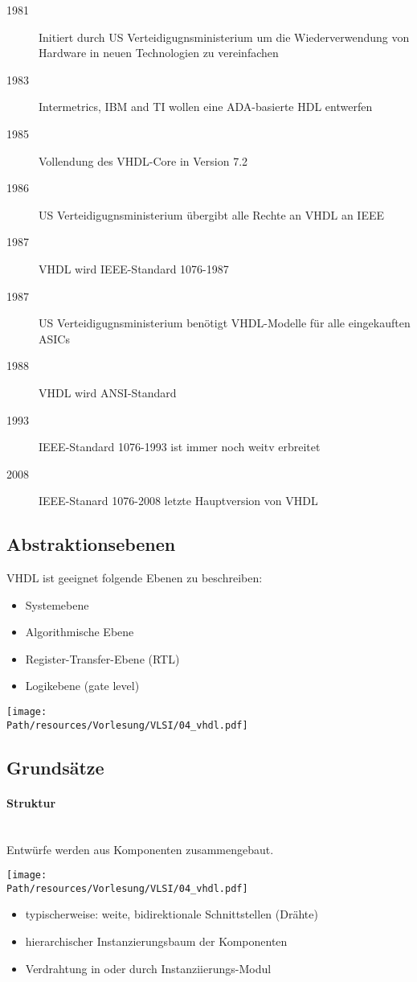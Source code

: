 	\begin{description}
		\item[1981] Initiert durch US Verteidigugnsministerium um die Wiederverwendung von Hardware in neuen Technologien zu vereinfachen
		\item[1983] Intermetrics, IBM and TI wollen eine ADA-basierte HDL entwerfen
		\item[1985] Vollendung des VHDL-Core in Version 7.2
		\item[1986] US Verteidigugnsministerium übergibt alle Rechte an VHDL an IEEE
		\item[1987] VHDL wird IEEE-Standard 1076-1987
		\item[1987] US Verteidigugnsministerium benötigt VHDL-Modelle für alle eingekauften ASICs
		\item[1988] VHDL wird ANSI-Standard
		\item[1993] IEEE-Standard 1076-1993 ist immer noch weitv erbreitet
		\item[2008] IEEE-Stanard 1076-2008 letzte Hauptversion von VHDL
	\end{description}

\subsection{Abstraktionsebenen}
	VHDL ist geeignet folgende Ebenen zu beschreiben:
	\begin{itemize}
		\item Systemebene
		\item Algorithmische Ebene
		\item Register-Transfer-Ebene (RTL)
		\item Logikebene (gate level)
	\end{itemize}
	\begin{center}
		\texttt{[image: \\Path/resources/Vorlesung/VLSI/04\_vhdl.pdf]}
	\end{center}

\subsection{Grundsätze}
	\paragraph{Struktur}\hfill\\
	Entwürfe werden aus Komponenten zusammengebaut.\\
	\begin{center}
		\texttt{[image: \\Path/resources/Vorlesung/VLSI/04\_vhdl.pdf]}
	\end{center}
	\begin{itemize}
		\item typischerweise: weite, bidirektionale Schnittstellen (Drähte)
		\item hierarchischer Instanzierungsbaum der Komponenten
		\item Verdrahtung in oder durch Instanziierungs-Modul
	\end{itemize}

